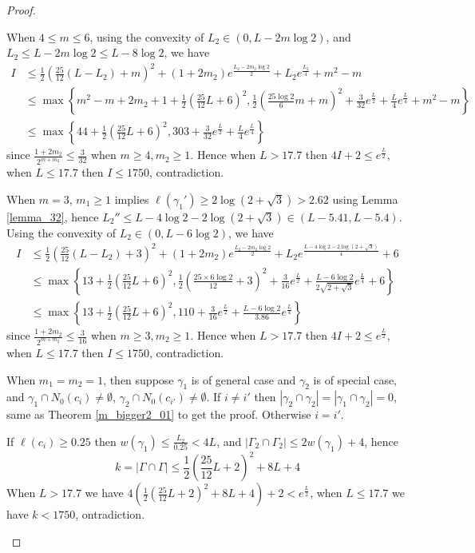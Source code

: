 \documentclass[11pt, a4paper]{article}
\theoremstyle{definition}
\theoremstyle{remark}
\newcommand{\abs}[1]{\left| #1 \right|}
\newcommand{\bracket}[1]{\left( #1 \right)}
\begin{document}
\begin{proof}
\begin{enumerate}
When $4\leqslant m\leqslant6$, using the convexity of $L_2\in(0,L-2m\log2)$, and $L_2\leqslant L-2m\log2\leqslant L-8\log2$, we have
\begin{align*}
 I&\leqslant\frac12\bracket{\frac{25}{12}(L-L_2)+m}^2+(1+2m_2)e^{\frac{L_2-2m_2\log2}2}+{L_2}e^{\frac{L_2}4}+m^2-m\\
&\leqslant\max\left\{m^2-m+2m_2+1+\frac12\bracket{\frac{25}{12}L+6}^2, \frac12\bracket{\frac{25\log2}{6}m+m}^2+\frac{3}{32}e^{\frac{L}{2}}+\frac{L}{4}e^{\frac{L}4}+m^2-m\right\}\\
&\leqslant\max\left\{44+\frac12\bracket{\frac{25}{12}L+6}^2, 303+\frac{3}{32}e^{\frac{L}{2}}+\frac{L}{4}e^{\frac{L}4}\right\}
\end{align*}
since $\frac{1+2m_2}{2^{m+m_2}}\leqslant\frac3{32}$ when $m\geqslant4, m_2\geqslant1$. Hence when $L>17.7$ then $4I+2\leqslant e^{\frac{L}2}$, when $L\leqslant17.7$ then $I\leqslant1750$, contradiction.

When $m=3$, $m_1\geqslant1$ implies $\ell(\gamma_1')\geqslant2\log(2+\sqrt3)>2.62$ using Lemma \ref{lemma_32}, hence $L_2''\leqslant L-4\log2-2\log(2+\sqrt3)\in(L-5.41,L-5.4)$. Using the convexity of $L_2\in(0,L-6\log2)$, we have
\begin{align*}
 I&\leqslant\frac12\bracket{\frac{25}{12}(L-L_2)+3}^2+(1+2m_2)e^{\frac{L_2-2m_2\log2}{2}}+{L_2}e^{\frac{L-4\log2-2\log(2+\sqrt3)}4}+6\\
&\leqslant\max\left\{13+\frac12\bracket{\frac{25}{12}L+6}^2,\frac12\bracket{\frac{25\times6\log2}{12}+3}^2+\frac{3}{16}e^{\frac{L}{2}}+\frac{L-6\log2}{2\sqrt{2+\sqrt3}}e^{\frac{L}4}+6\right\}\\
&\leqslant\max\left\{13+\frac12\bracket{\frac{25}{12}L+6}^2, 110+\frac{3}{16}e^{\frac{L}{2}}+\frac{L-6\log2}{3.86}e^{\frac{L}4}\right\}
\end{align*}
since $\frac{1+2m_2}{2^{m+m_2}}\leqslant\frac3{16}$ when $m\geqslant3, m_2\geqslant1$. Hence when $L>17.7$ then $4I+2\leqslant e^{\frac{L}2}$, when $L\leqslant17.7$ then $I\leqslant1750$, contradiction.




When $m_1=m_2=1$, then suppose $\gamma_1$ is of general case and $\gamma_2$ is of special case, and $\gamma_1\cap N_0(c_i)\neq\emptyset$, $\gamma_2\cap N_0(c_{i'})\neq\emptyset$. If $i\neq i'$ then $\abs{\gamma_2\cap\gamma_2}=\abs{\gamma_1\cap\gamma_2}=0$, same as Theorem \ref{m_bigger2_01} to get the proof. Otherwise $i=i'$. 

If $\ell(c_i)\geqslant 0.25$ then $w(\gamma_1)\leqslant\frac{L_2}{0.25}<4L$, and $\abs{\Gamma_2\cap\Gamma_2}\leqslant2w(\gamma_1)+4$, hence 
$$k=\abs{\Gamma\cap\Gamma}\leqslant\frac12\bracket{\frac{25}{12}L+2}^2+8L+4$$ 
When $L>17.7$ we have $4(\frac12\bracket{\frac{25}{12}L+2}^2+8L+4)+2<e^{\frac{L}2}$, when $L\leqslant17.7$ we have $k<1750$, ontradiction.


\end{enumerate}
\end{proof}
\end{document}
